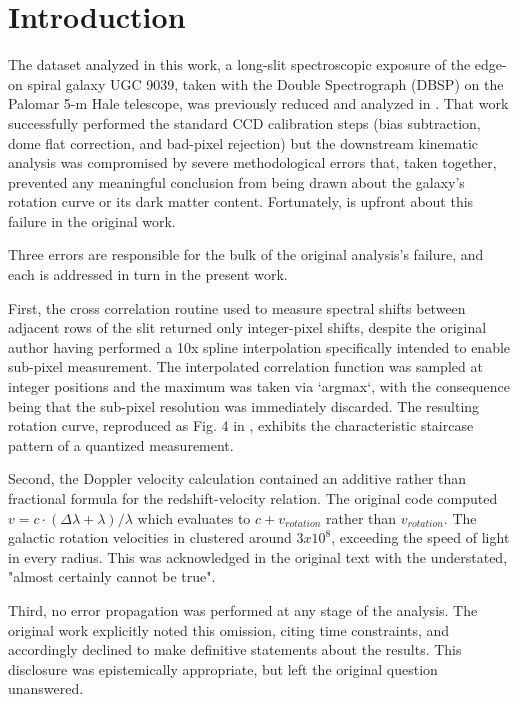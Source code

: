 \documentclass{aa}
\begin{document}
   \maketitle


\section{Introduction}

    The dataset analyzed in this work, a long-slit spectroscopic exposure of the edge-on spiral galaxy UGC 9039, taken with the Double Spectrograph (DBSP) on the Palomar 5-m Hale telescope, was previously reduced and analyzed in \cite{fraustro}. That work successfully performed the standard CCD calibration steps (bias subtraction, dome flat correction, and bad-pixel rejection) but the downstream kinematic analysis was compromised by severe methodological errors that, taken together, prevented any meaningful conclusion from being drawn about the galaxy's rotation curve or its dark matter content. Fortunately, \cite{fraustro} is upfront about this failure in the original work.

    Three errors are responsible for the bulk of the original analysis's failure, and each is addressed in turn in the present work.

    First, the cross correlation routine used to measure spectral shifts between adjacent rows of the slit returned only integer-pixel shifts, despite the original author having performed a 10x spline interpolation specifically intended to enable sub-pixel measurement. The interpolated correlation function was sampled at integer positions and the maximum was taken via `argmax`, with the consequence being that the sub-pixel resolution was immediately discarded. The resulting rotation curve, reproduced as Fig. 4 in \cite{fraustro}, exhibits the characteristic staircase pattern of a quantized measurement.

    Second, the Doppler velocity calculation contained an additive rather than fractional formula for the redshift-velocity relation. The original code computed $v=c\cdot(\Delta\lambda+\lambda)/\lambda$ which evaluates to $c+v_{rotation}$ rather than $v_{rotation}$. The galactic rotation velocities in \cite{fraustro} clustered around $3 x 10^{8}$, exceeding the speed of light in every radius. This was acknowledged in the original text with the understated, "almost certainly cannot be true".

    Third, no error propagation was performed at any stage of the analysis. The original work explicitly noted this omission, citing time constraints, and accordingly declined to make definitive statements about the results. This disclosure was epistemically appropriate, but left the original question unanswered.
\end{document}
